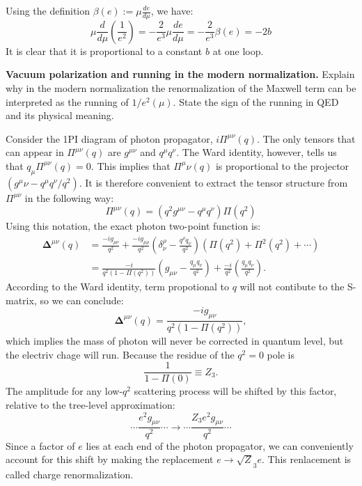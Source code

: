 \begin{solution}[22.4]
	Using the definition $\beta(e):=\mu\frac{de}{d\mu}$, we have:
	\[
	\mu\frac{d}{d\mu}\left(\frac{1}{e^2}\right)=-\frac{2}{e^3}\mu\frac{de}{d\mu}=-\frac{2}{e^3}\beta(e)=-2b
	\]
	It is clear that it is proportional to a constant $b$ at one loop.
\end{solution}
\begin{problem}
    \textbf{Vacuum polarization and running in the modern normalization.} Explain why in the modern normalization the renormalization of the Maxwell term can be interpreted as the running of \(1/e^2(\mu)\). State the sign of the running in QED and its physical meaning.
\end{problem}
\begin{solution}[22.5]
	Consider the 1PI diagram of photon propagator, $i\Pi^{\mu\nu}(q)$. The only tensors that can appear in $\Pi^{\mu\nu}(q)$ are $g^{\mu\nu}$ and $q^\mu q^\nu.$ The Ward identity, however, tells us that $q_\mu \Pi ^{\mu \nu }( q) = 0.$ This implies that $\Pi^\mu\nu(q)$ is proportional to the projector $(g^\mu\nu-q^\mu q^\nu/q^2)$. It is therefore convenient to extract the tensor structure from $\Pi^{\mu\nu}$ in the following way:
	\[
	\Pi^{\mu\nu}(q)=(q^2g^{\mu\nu}-q^\mu q^\nu)\Pi(q^2)
	\]
	Using this notation, the exact photon two-point function is:
	\[
	\begin{aligned}\mathbf{\Delta}^{\mu\nu}(q)&=\frac{-ig_{\mu\nu}}{q^{2}}+\frac{-ig_{\mu\rho}}{q^{2}}\left(\delta_{\nu}^{\rho}-\frac{q^{\rho}q_{\nu}}{q^{2}}\right)\left(\Pi(q^{2})+\Pi^{2}(q^{2})+\cdots\right)\\&=\frac{-i}{q^{2}\left(1-\Pi(q^{2})\right)}\left(g_{\mu\nu}-\frac{q_{\mu}q_{\nu}}{q^{2}}\right)+\frac{-i}{q^{2}}\left(\frac{q_{\mu}q_{\nu}}{q^{2}}\right).\end{aligned}
	\]
	According to the Ward identity, term propotional to $q$ will not contibute to the S-matrix, so we can conclude:
	\[
	\boxed{
	\mathbf{\Delta}^{\mu\nu}(q)=\frac{-ig_{\mu\nu}}{q^2\left(1-\Pi(q^2)\right)}
	},
	\]
	which implies the mass of photon will never be corrected in quantum level, but the electriv chage will run. Because the residue of the $q^2=0$ pole is
	$$\frac1{1-\Pi(0)}\equiv Z_3.$$
	The amplitude for any low-$q^2$ scattering process will be shifted by this factor,
	relative to the tree-level approximation:
	\[
	\cdots\frac{e^2g_{\mu\nu}}{q^2}\cdots\longrightarrow\cdots\frac{Z_3e^2g_{\mu\nu}}{q^2}\cdots
	\]
	Since a factor of $e$ lies at each end of the photon propagator, we can conveniently account for this shift by making the replacement $e\to\sqrt Z_3e.$ This renlacement is called charge renormalization.
	

\end{solution}
